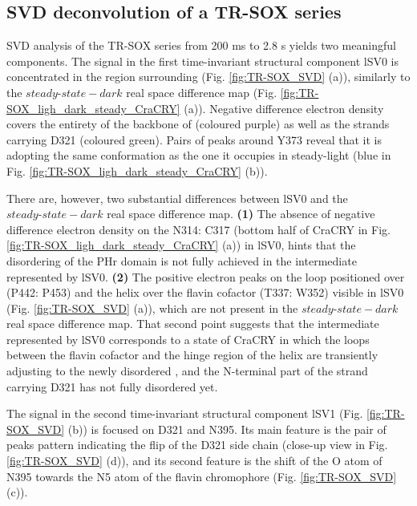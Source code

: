 \begin{figure}[H]
\end{figure}

\subsection{SVD deconvolution of a TR-SOX series}\label{sec:TR-SOX_SVD}

SVD analysis of the TR-SOX series from 200 ms to 2.8 s yields two meaningful components. The signal in the first time-invariant structural component lSV0 is concentrated in the region surrounding  (Fig. \ref{fig:TR-SOX_SVD} (a)), similarly to the \(steady\mbox{-}state - dark\) real space difference map (Fig. \ref{fig:TR-SOX_ligh_dark_steady_CraCRY} (a)). Negative difference electron density covers the entirety of  the backbone of  (coloured purple) as well as the strands carrying D321 (coloured green). Pairs of peaks around Y373 reveal that it is adopting the same conformation as the one it occupies in steady-light (blue in Fig. \ref{fig:TR-SOX_ligh_dark_steady_CraCRY} (b)). 

There are, however, two substantial differences between lSV0 and the \(steady\mbox{-}state - dark\) real space difference map. \textbf{(1)} The absence of negative difference electron density on the N314: C317 (bottom half of CraCRY in Fig. \ref{fig:TR-SOX_ligh_dark_steady_CraCRY} (a)) in lSV0, hints that the disordering of the PHr domain is not fully achieved in the intermediate represented by lSV0. \textbf{(2)} The positive electron peaks on the loop positioned over  (P442: P453) and the helix over the flavin cofactor (T337: W352) visible in lSV0 (Fig. \ref{fig:TR-SOX_SVD} (a)), which are not present in the \(steady\mbox{-}state - dark\) real space difference map. That second point suggests that the intermediate represented by lSV0 corresponds to a state of CraCRY in which the loops between the flavin cofactor and the hinge region of the helix are transiently adjusting to the newly disordered , and the N-terminal part of the strand carrying D321 has not fully disordered yet.

The signal in the second time-invariant structural component lSV1 (Fig. \ref{fig:TR-SOX_SVD} (b)) is focused on D321 and N395. Its main feature is the pair of peaks pattern indicating the flip of the D321 side chain (close-up view in Fig. \ref{fig:TR-SOX_SVD} (d)), and its second feature is the shift of the O atom of N395 towards the N5 atom of the flavin chromophore (Fig. \ref{fig:TR-SOX_SVD} (c)). 

